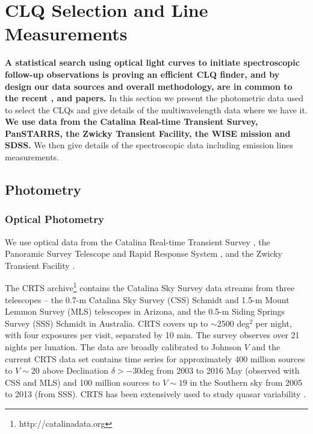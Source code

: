 \documentclass[fleqn,usenatbib]{mnras}
\begin{document}
\section{CLQ Selection and Line Measurements}
{\bf A statistical search using optical light curves to initiate spectroscopic follow-up
  observations is proving an efficient CLQ finder, and by design
our data sources and overall methodology, are in common to the recent
\citet{Ross2018}, \citet{Stern2018} and \citet{Graham2020} papers.
}
%
In this section we present the photometric data used to select the
CLQs and give details of the multiwavelength data where we have it.
{\bf We use data from the Catalina Real-time Transient Survey, PanSTARRS,
  the Zwicky Transient Facility, the WISE mission and SDSS.}
We then give details of the spectroscopic data including emission
lines measurements.

\subsection{Photometry}
\subsubsection{Optical Photometry}
We use optical data from the Catalina Real-time Transient Survey
\citep[CRTS;][]{Drake2009, Mahabal2011}, the Panoramic Survey
Telescope and Rapid Response System \citep[PanSTARRS;][]{Kaiser2010,
Stubbs2010, Tonry2012, Magnier2013}, and the Zwicky Transient Facility
\citep[ZTF;][]{Bellm2019_ZTFOverview}. 

The CRTS archive\footnote{http://catalinadata.org} contains the
Catalina Sky Survey data streams from three telescopes -- the 0.7-m
Catalina Sky Survey (CSS) Schmidt and 1.5-m Mount Lemmon Survey (MLS)
telescopes in Arizona, and the 0.5-m Siding Springs Survey (SSS)
Schmidt in Australia. CRTS covers up to $\sim$2500 deg$^2$ per night,
with four exposures per visit, separated by 10 min. The survey observes
over 21 nights per lunation. The data are broadly calibrated to
Johnson $V$ \citep[for details, see][]{Drake2013} and the current CRTS
data set contains time series for approximately 400 million sources to
$V \sim 20$ above Declination $\delta > -30$deg from 2003 to 2016 May (observed with CSS
and MLS) and 100 million sources to $V \sim 19$ in the Southern sky
from 2005 to 2013 (from SSS). CRTS has been extensively used to study 
quasar variability \citep[e.g.,][]{Graham2014, Graham2015, Graham2015Nature,
Graham2017, Graham2020, Stern2017, Stern2018, Ross2018}.
\end{document}
